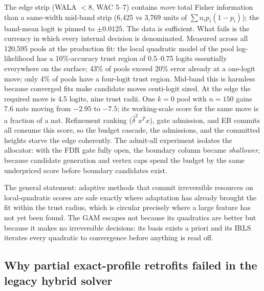 \documentclass[11pt]{article}
\begin{document}
The edge strip (WALA $<8$, WAC 5--7) contains \emph{more} total Fisher
information than a same-width mid-band strip (6{,}425 vs 3{,}769 units
of $\sum n_i p_i(1-p_i)$); the band-mean logit is pinned to
$\pm 0.0125$. The data is sufficient. What fails is the currency in
which every internal decision is denominated. Measured across all
120{,}595 pools at the production fit: the local quadratic model of
the pool log-likelihood has a 10\%-accuracy trust region of 0.5--0.75
logits essentially everywhere on the surface; 43\% of pools exceed
20\% error already at a one-logit move; only 4\% of pools have a
four-logit trust region. Mid-band this is harmless because converged
fits make candidate moves centi-logit sized. At the edge the required
move is 4.5 logits, nine trust radii. One $k=0$ pool with $n=150$
gains 7.6 nats moving from $-2.95$ to $-7.5$; its working-scale score
for the same move is a fraction of a nat. Refinement ranking
($\hat\delta^2 x^Tx$), gate admission, and EB commits all consume this
score, so the budget cascade, the admissions, and the committed
heights starve the edge coherently. The admit-all experiment isolates
the allocator: with the FDR gate fully open, the boundary column
became \emph{shallower}, because candidate generation and vertex caps
spend the budget by the same underpriced score before boundary
candidates exist.

The general statement: adaptive methods that commit irreversible
resources on local-quadratic scores are safe exactly where adaptation
has already brought the fit within the trust radius, which is circular
precisely where a large feature has not yet been found. The GAM
escapes not because its quadratics are better but because it makes no
irreversible decisions: its basis exists a priori and its IRLS
iterates every quadratic to convergence before anything is read off.

\subsection{Why partial exact-profile retrofits failed in the legacy hybrid solver}
\end{document}
